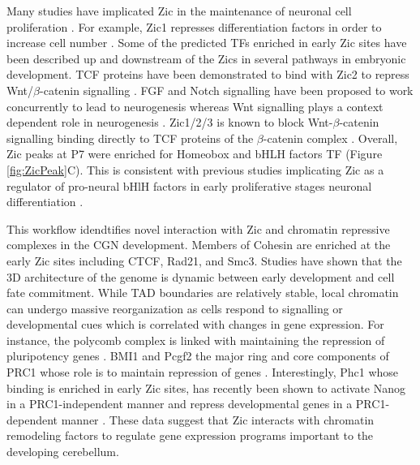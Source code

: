 \documentclass[fleqn,10pt,twocolumn]{wlscirep}
\begin{document}
Many studies have implicated Zic in the maintenance of neuronal cell proliferation \cite{Lim2007Zic3Cells, Janesick2013ErfNeurogensis, Aruga2002Zic1Differentiation, Ebert2003Zic1Autoregulation}. For example, Zic1 represses differentiation factors in order to increase cell number \cite{Aruga2002Zic1Differentiation}. Some of the predicted TFs enriched in early Zic sites have been described up and downstream of the Zics in several pathways in embryonic development. TCF proteins have been demonstrated to bind with Zic2 to repress  Wnt/$\beta$-catenin signalling \cite{Aruga2018Zic1, Lowenstein2021Olig3Development}. FGF and Notch signalling have been proposed to work concurrently to lead to neurogenesis \cite{Voelkel2014FGFHierarchy} whereas Wnt signalling plays a context dependent role in neurogenesis \cite{Lassiter2014SignalingDelamination}. Zic1/2/3 is known to block Wnt-$\beta$-catenin signalling binding directly to TCF proteins of the $\beta$-catenin complex \cite{Ge2020Zic1Transition, Fujimi2012XenopusPathway, Murgan2015AtypicalPrecursors, Pourebrahim2011TranscriptionSignaling, Aruga2018ZicDisease,Aruga2018Zic1,Lowenstein2021Olig3Development}.  Overall, Zic peaks at P7 were enriched for Homeobox and bHLH factors TF (Figure \ref{fig:ZicPeak}C). This is consistent with previous studies implicating Zic as a regulator of pro-neural bHlH factors in early proliferative stages neuronal differentiation \cite{Aruga2018ZicDisease}. 


This workflow idendtifies novel interaction with Zic and chromatin repressive complexes in the CGN development. Members of Cohesin are enriched at the early Zic sites including CTCF, Rad21, and Smc3. Studies have shown that the 3D architecture of the genome is dynamic between early development and cell fate commitment. While TAD boundaries are relatively stable, local chromatin can undergo massive reorganization as cells respond to signalling or developmental cues which is correlated with changes in gene expression\cite{Zheng2019TheDifferentiaition, Bonev2016OrganizationGenome}. For instance, the polycomb complex is linked with maintaining the repression of pluripotency genes \cite{Riising2014GeneWide}. BMI1 and Pcgf2 the major ring  and core components of PRC1 whose role is to maintain repression of genes \cite{Aranda2015RegulationProteins}. Interestingly, Phc1 whose binding is enriched in early Zic sites, has recently been shown to activate  Nanog in a PRC1-independent manner and repress developmental genes in a PRC1-dependent manner \cite{Chen2021Phc1Locus}. These data suggest that Zic interacts with chromatin remodeling factors to regulate gene expression programs important to the developing cerebellum. 
\end{document}
